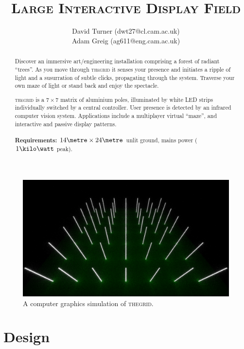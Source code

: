 \documentclass[12pt]{article} %
\title{\thegrid\\\small{\textsc{Large Interactive Display Field}}}
\author{\small{David Turner (dwt27@cl.cam.ac.uk)}\\
        \small{Adam Greig (ag611@eng.cam.ac.uk)}}
\date{} %
\newcommand{\thegrid}{\textsc{the\textperiodcentered grid}\xspace}
\begin{document}
\maketitle

\renewcommand{\abstractname}{Summary}
\begin{abstract}
Discover an immersive art/engineering installation comprising a forest of
radiant ``trees''.  As you move through \thegrid it senses your presence and
initiates a ripple of light and a susurration of subtle clicks, propagating
through the system.  Traverse your own maze of light or stand back and enjoy
the spectacle.

\vspace{5mm}

\thegrid is a $7\times7$ matrix of aluminium poles, illuminated by white LED
strips individually switched by a central controller.  User presence is
detected by an infrared computer vision system.  Applications include a
multiplayer virtual ``maze'', and interactive and passive display patterns.
\\
~
\\
\textbf{Requirements:} $14\metre \times 24\metre$ unlit ground, mains power
($1\kilo\watt$ peak).
\end{abstract}

\begin{figure}[h]
    \centering
    \includegraphics[width=\textwidth]{pics/render1.png}
    \caption{A computer graphics simulation of \thegrid.}
\end{figure}

\clearpage
\section{Design}
\end{document}
